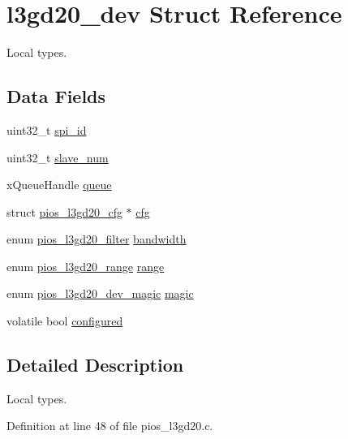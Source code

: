 \hypertarget{structl3gd20__dev}{\section{l3gd20\-\_\-dev \-Struct \-Reference}
\label{structl3gd20__dev}
}


\-Local types.  


\subsection*{\-Data \-Fields}
\begin{DoxyCompactItemize}
\item 
uint32\-\_\-t \hyperlink{structl3gd20__dev_a8d81d143afb3dd150d8302d4ffa9f1c5}{spi\-\_\-id}
\item 
uint32\-\_\-t \hyperlink{structl3gd20__dev_a8bf2ef5a58b8a774ee762ff497ddcd91}{slave\-\_\-num}
\item 
x\-Queue\-Handle \hyperlink{structl3gd20__dev_afaf30977299d2f23c110c98529cf35f3}{queue}
\item 
struct \hyperlink{structpios__l3gd20__cfg}{pios\-\_\-l3gd20\-\_\-cfg} $\ast$ \hyperlink{structl3gd20__dev_af09c2ac64d5d4b325ba45fa55554eecb}{cfg}
\item 
enum \hyperlink{group___p_i_o_s___l3_g_d20_ga61c11c9fa344e4d6a9087dd81414d54c}{pios\-\_\-l3gd20\-\_\-filter} \hyperlink{structl3gd20__dev_a0083cd18fa543ff4b6cf593ffd4ddf19}{bandwidth}
\item 
enum \hyperlink{group___p_i_o_s___l3_g_d20_ga704696d385abb591516d2e31301dad66}{pios\-\_\-l3gd20\-\_\-range} \hyperlink{structl3gd20__dev_a76218293ab5447354c7f7f0b2772a8f3}{range}
\item 
enum \hyperlink{group___p_i_o_s___l3_g_d20_ga34e70adc9970e3e83c4d39e720087df3}{pios\-\_\-l3gd20\-\_\-dev\-\_\-magic} \hyperlink{structl3gd20__dev_abfaba1dcc53adeb1fe6ba7fdb174d78a}{magic}
\item 
volatile bool \hyperlink{structl3gd20__dev_a1a9fd22015b26a283f294efe6824ff51}{configured}
\end{DoxyCompactItemize}


\subsection{\-Detailed \-Description}
\-Local types. 

\-Definition at line 48 of file pios\-\_\-l3gd20.\-c.



